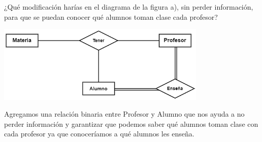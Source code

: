 ¿Qué modificación harías en el diagrama de la figura a), sin perder información, para que se puedan conocer qué alumnos toman clase cada profesor?
\begin{center}
    
\includegraphics[width=10cm]{resources/2.2.png}
\end{center}
Agregamos una relación binaria entre Profesor y Alumno que nos ayuda a no perder información y garantizar que podemos saber qué alumnos toman clase con cada profesor ya que conoceríamos a qué alumnos les enseña. 